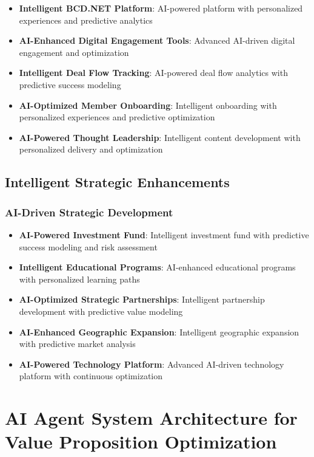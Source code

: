 \begin{itemize}
    \item \textbf{Intelligent BCD.NET Platform}: AI-powered platform with personalized experiences and predictive analytics
    \item \textbf{AI-Enhanced Digital Engagement Tools}: Advanced AI-driven digital engagement and optimization
    \item \textbf{Intelligent Deal Flow Tracking}: AI-powered deal flow analytics with predictive success modeling
    \item \textbf{AI-Optimized Member Onboarding}: Intelligent onboarding with personalized experiences and predictive optimization
    \item \textbf{AI-Powered Thought Leadership}: Intelligent content development with personalized delivery and optimization
\end{itemize}

\subsection{Intelligent Strategic Enhancements}

\subsubsection{AI-Driven Strategic Development}

\begin{itemize}
    \item \textbf{AI-Powered Investment Fund}: Intelligent investment fund with predictive success modeling and risk assessment
    \item \textbf{Intelligent Educational Programs}: AI-enhanced educational programs with personalized learning paths
    \item \textbf{AI-Optimized Strategic Partnerships}: Intelligent partnership development with predictive value modeling
    \item \textbf{AI-Enhanced Geographic Expansion}: Intelligent geographic expansion with predictive market analysis
    \item \textbf{AI-Powered Technology Platform}: Advanced AI-driven technology platform with continuous optimization
\end{itemize}

\section{AI Agent System Architecture for Value Proposition Optimization}

